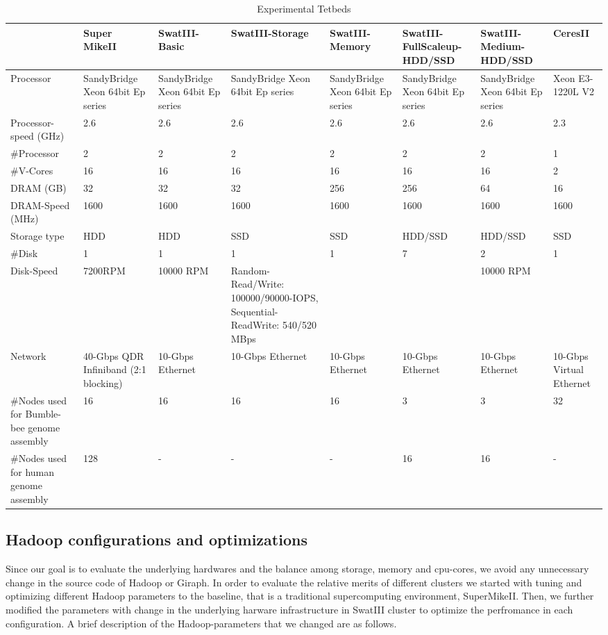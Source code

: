 \documentclass[conference]{IEEEtran}
\begin{document}
\begin{table}
\begin{center}
    \begin{tabular}{ |p{1.3cm} | p{1.3cm} | p{1.3cm} | p{1.3cm} | p{1.3cm} | p{1.3cm} | p{1.3cm}| p{1.3cm}|} \hline
    & Super MikeII & SwatIII-Basic & SwatIII-Storage & SwatIII-Memory & SwatIII-FullScaleup-HDD/SSD & SwatIII-Medium-HDD/SSD & CeresII \\ \hline
    Processor & SandyBridge Xeon 64bit Ep series & SandyBridge Xeon 64bit Ep series & SandyBridge Xeon 64bit Ep series & SandyBridge Xeon 64bit Ep series & SandyBridge Xeon 64bit Ep series & SandyBridge Xeon 64bit Ep series &  Xeon E3-1220L V2 \\ \hline
    Processor-speed (GHz) & 2.6 & 2.6 & 2.6 & 2.6 & 2.6 & 2.6 & 2.3 \\ \hline
    \#Processor & 2 & 2 & 2 & 2 & 2 & 2 & 1 \\ \hline
    \#V-Cores & 16 & 16 & 16 & 16 & 16 & 16 & 2 \\ \hline \hline
    DRAM (GB) & 32 & 32 & 32 & 256 & 256 & 64 & 16  \\ \hline
    DRAM-Speed (MHz) & 1600 & 1600  & 1600  & 1600  & 1600  & 1600 & 1600 \\ \hline \hline
	Storage type & HDD & HDD & SSD & SSD & HDD/SSD & HDD/SSD & SSD \\ \hline    
    \#Disk & 1 & 1 & 1 & 1 & 7 & 2 & 1 \\ \hline
    Disk-Speed & 7200RPM & 10000 RPM & Random-Read/Write: 100000/90000-IOPS, Sequential-Read\/Write: 540/520 MBps &   &   & 10000 RPM &   \\ \hline \hline
    Network & 40-Gbps QDR Infiniband (2:1 blocking) & 10-Gbps Ethernet & 10-Gbps Ethernet & 10-Gbps Ethernet & 10-Gbps Ethernet & 10-Gbps Ethernet & 10-Gbps Virtual Ethernet\\ \hline \hline
    \#Nodes used for Bumble-bee genome assembly & 16 & 16 & 16 & 16 & 3 & 3 & 32 \\ \hline
    \#Nodes used for human genome assembly & 128 & - & - & - & 16 & 16 & - \\ \hline
    \end{tabular}
    \caption{Experimental Tetbeds}
	\label{table:Experimentaltestbeds}
\end{center}
\end{table}

\subsection {Hadoop configurations and optimizations} \label{HadoopConfigurationsAndoptimizations}
Since our goal is to evaluate the underlying hardwares and the balance among storage, memory and cpu-cores, we avoid any unnecessary change in the source code of Hadoop or Giraph. 
In order to evaluate the relative merits of different clusters we started with tuning and optimizing different Hadoop parameters to the baseline, that is a traditional supercomputing environment, SuperMikeII. Then, we further modified the parameters with change in the underlying harware infrastructure in SwatIII cluster to optimize the perfromance in each configuration.
A brief description of the Hadoop-parameters that we changed are as follows.
  
\end{document}
